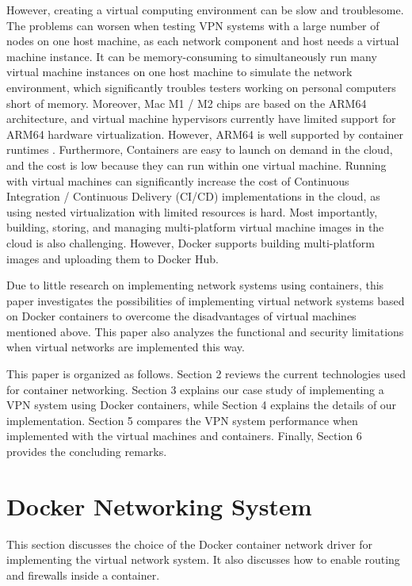 \documentclass[article]{aaltoseries}
\begin{document}
However, creating a virtual computing environment can be slow and troublesome. The problems can worsen when testing VPN systems with a large number of nodes on one host machine, as each network component and host needs a virtual machine instance. It can be memory-consuming to simultaneously run many virtual machine instances on one host machine to simulate the network environment, which significantly troubles testers working on personal computers short of memory. Moreover, Mac M1 / M2 chips are based on the ARM64 architecture, and virtual machine hypervisors currently have limited support for ARM64 hardware virtualization. However, ARM64 is well supported by container runtimes \cite{9852232}. Furthermore, Containers are easy to launch on demand in the cloud, and the cost is low because they can run within one virtual machine. Running with virtual machines can significantly increase the cost of Continuous Integration / Continuous Delivery (CI/CD) implementations in the cloud, as using nested virtualization with limited resources is hard. Most importantly, building, storing, and managing multi-platform virtual machine images in the cloud is also challenging. However, Docker supports building multi-platform images \cite{dockermultiplatform} and uploading them to Docker Hub.

Due to little research on implementing network systems using containers, this paper investigates the possibilities of implementing virtual network systems based on Docker containers to overcome the disadvantages of virtual machines mentioned above. This paper also analyzes the functional and security limitations when virtual networks are implemented this way.

This paper is organized as follows. Section 2 reviews the current technologies used for container networking. Section 3 explains our case study of implementing a VPN system using Docker containers, while Section 4 explains the details of our implementation. Section 5 compares the VPN system performance when implemented with the virtual machines and containers. Finally, Section 6 provides the concluding remarks.



\section{Docker Networking System}
This section discusses the choice of the Docker container network driver for implementing the virtual network system. It also discusses how to enable routing and firewalls inside a container.
\end{document}
